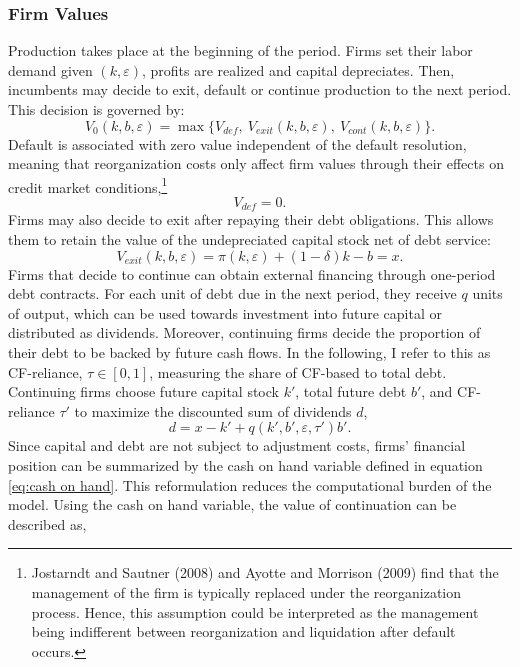 \documentclass[12pt]{article}
\begin{document}
\subsubsection{Firm Values} \label{sec:Firm Values}
Production takes place at the beginning of the period. Firms set their labor demand given $(k,\varepsilon)$, profits are realized and capital depreciates. Then, incumbents may decide to exit, default or continue production to the next period. This decision is governed by: 
\begin{equation} \label{eq:default decision}
 V_0(k,b,\varepsilon) = \max \{V_{def}, \  V_{exit}(k,b,\varepsilon), \ V_{cont}(k,b,\varepsilon) \}.
\end{equation}
Default is associated with zero value independent of the default resolution, meaning that reorganization costs only affect firm values through their effects on credit market conditions,\footnote{Jostarndt and Sautner (2008) and Ayotte and Morrison (2009) find that the management of the firm is typically replaced under the reorganization process. Hence, this assumption could be interpreted as the management being indifferent between reorganization and liquidation after default occurs.} 
\begin{equation}
 V_{def} = 0.
\end{equation}
Firms may also decide to exit after repaying their debt obligations. This allows them to retain the value of the undepreciated capital stock net of debt service: 
\begin{equation}
    V_{exit}(k, b, \varepsilon) = \pi(k,\varepsilon) + (1-\delta)k - b  = x.
\end{equation}
Firms that decide to continue can obtain external financing through one-period debt contracts. For each unit of debt due in the next period, they receive $q$ units of output, which can be used towards investment into future capital or distributed as dividends. Moreover, continuing firms decide the proportion of their debt to be backed by future cash flows. In the following, I refer to this as CF-reliance, $\tau \in [0,1]$, measuring the share of CF-based to total debt. \vspace{3mm} \\
Continuing firms choose future capital stock $k'$, total future debt $b'$, and CF-reliance $\tau'$ to maximize the discounted sum of dividends $d$, 
\begin{equation} \label{eq:dividends}
d = x - k' +  q(k',b',\varepsilon, \tau')b'.
\end{equation} 
Since capital and debt are not subject to adjustment costs, firms' financial position can be summarized by the cash on hand variable defined in equation \ref{eq:cash on hand}. This reformulation reduces the computational burden of the model. Using the cash on hand variable, the value of continuation can be described as,
\end{document}
